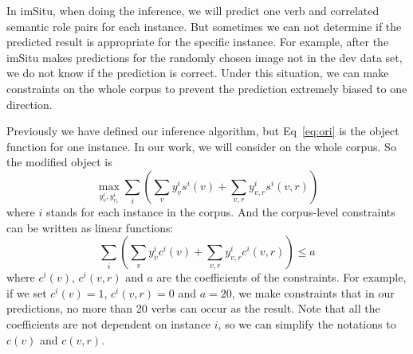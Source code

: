 

\iffalse

In imSitu, when doing the inference, we will predict one verb and correlated semantic role pairs for each instance. But sometimes we can not determine if  the predicted result is appropriate  for the specific instance. 
For example, after the imSitu makes predictions for the randomly chosen image not in the dev data set, we do not know if the prediction is correct. Under this situation, we can make constraints on the whole corpus to prevent the prediction extremely biased to one direction. 

Previously we have defined our inference algorithm, but
Eq~\eqref{eq:ori} is the object function for one instance. In our work, we will consider on the whole corpus. So the modified object is 
\begin{equation}
 \max_{y^i_v, y^i_{v_r}}{\sum_i(\sum_v y^i_v s^i(v) + \sum_{v,r}y^i_{v,r}s^i(v,r))}
 \label{eq:con_obj}
\end{equation}
where $i$ stands for each instance in the corpus.
And the corpus-level constraints can be written as linear functions:
\begin{equation}\label{eq:cor_cons}
 \sum_i(\sum_v y^i_v c^i(v) + \sum_{v,r}y^i_{v,r}c^i(v,r)) \leq a
\end{equation}
where $c^i(v)$, $c^i(v,r)$ and $a$ are the coefficients of the constraints. For example, if we set $c^i(v) = 1$, $c^i(v,r) = 0$ and $a = 20$, we make constraints that in our predictions, no more than 20 verbs can occur as the result. Note that all the coefficients are not dependent on instance $i$, so we can simplify the notations to $c(v)$ and $c(v,r)$.

